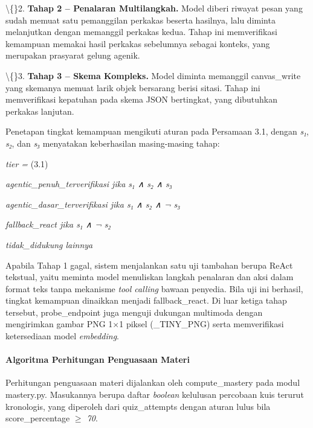 \documentclass[12pt,a4paper]{article}
\begin{document}
\textbackslash\{\}2. \textbf{Tahap 2 -- Penalaran Multilangkah.} Model diberi riwayat pesan yang sudah memuat satu pemanggilan perkakas beserta hasilnya, lalu diminta melanjutkan dengan memanggil perkakas kedua. Tahap ini memverifikasi kemampuan memakai hasil perkakas sebelumnya sebagai konteks, yang merupakan prasyarat gelung agenik.



\textbackslash\{\}3. \textbf{Tahap 3 -- Skema Kompleks.} Model diminta memanggil canvas\_write yang skemanya memuat larik objek bersarang berisi sitasi. Tahap ini memverifikasi kepatuhan pada skema JSON bertingkat, yang dibutuhkan perkakas lanjutan.



Penetapan tingkat kemampuan mengikuti aturan pada Persamaan 3.1, dengan \textit{s₁}, \textit{s₂}, dan \textit{s₃} menyatakan keberhasilan masing-masing tahap:



\textit{tier =}	(3.1)



\textit{agentic\_penuh\_terverifikasi   jika s₁ ∧ s₂ ∧ s₃}



\textit{agentic\_dasar\_terverifikasi   jika s₁ ∧ s₂ ∧ ¬ s₃}



\textit{fallback\_react   jika s₁ ∧ ¬ s₂}



\textit{tidak\_didukung   lainnya}



Apabila Tahap 1 gagal, sistem menjalankan satu uji tambahan berupa ReAct tekstual, yaitu meminta model menuliskan langkah penalaran dan aksi dalam format teks tanpa mekanisme \textit{tool calling} bawaan penyedia. Bila uji ini berhasil, tingkat kemampuan dinaikkan menjadi fallback\_react. Di luar ketiga tahap tersebut, probe\_endpoint juga menguji dukungan multimoda dengan mengirimkan gambar PNG 1\textit{$\times$}1 piksel (\_TINY\_PNG) serta memverifikasi ketersediaan model \textit{embedding}.



\paragraph*{Algoritma Perhitungan Penguasaan Materi}

Perhitungan penguasaan materi dijalankan oleh compute\_mastery pada modul mastery.py. Masukannya berupa daftar \textit{boolean} kelulusan percobaan kuis terurut kronologis, yang diperoleh dari quiz\_attempts dengan aturan lulus bila score\_percentage \textit{$\ge$ 70}.
\end{document}
